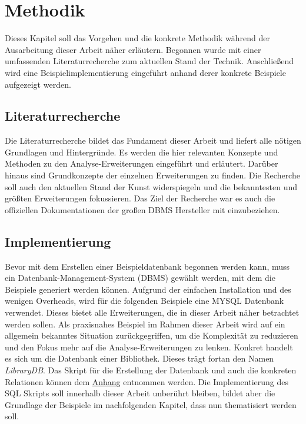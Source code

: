 \chapter{Methodik}
\label{chap:methodik} Dieses Kapitel soll das Vorgehen und die konkrete Methodik
während der Ausarbeitung dieser Arbeit näher erläutern. Begonnen wurde mit einer
umfassenden Literaturrecherche zum aktuellen Stand der Technik. Anschließend wird
eine Beispielimplementierung eingeführt anhand derer konkrete Beispiele aufgezeigt
werden.

\section{Literaturrecherche}
\label{sec:literaturrecherche} Die Literaturrecherche bildet das Fundament dieser
Arbeit und liefert alle nötigen Grundlagen und Hintergründe. Es werden die hier
relevanten Konzepte und Methoden zu den Analyse-Erweiterungen eingeführt und
erläutert. Darüber hinaus sind Grundkonzepte der einzelnen Erweiterungen zu finden.
Die Recherche soll auch den aktuellen Stand der Kunst widerspiegeln und die
bekanntesten und größten Erweiterungen fokussieren. Das Ziel der Recherche war es
auch die offiziellen Dokumentationen der großen DBMS Hersteller mit einzubeziehen.

\section{Implementierung}
\label{sec:implementierung} Bevor mit dem Erstellen einer Beispieldatenbank begonnen
werden kann, muss ein Datenbank-Management-System (DBMS) gewählt werden, mit dem
die Beispiele generiert werden können. Aufgrund der einfachen Installation und
des wenigen Overheads, wird für die folgenden Beispiele eine MYSQL Datenbank verwendet.
Dieses bietet alle Erweiterungen, die in dieser Arbeit näher betrachtet werden sollen.
Als praxisnahes Beispiel im Rahmen dieser Arbeit wird auf ein allgemein
bekanntes Situation zurückgegriffen, um die Komplexität zu reduzieren und den Fokus
mehr auf die Analyse-Erweiterungen zu lenken. Konkret handelt es sich um die
Datenbank einer Bibliothek. Dieses trägt fortan den Namen \textit{LibraryDB}. Das
Skript für die Erstellung der Datenbank und auch die konkreten Relationen können
dem \hyperref[sec:library_db]{Anhang} entnommen werden. Die Implementierung des
SQL Skripts soll innerhalb dieser Arbeit unberührt bleiben, bildet aber die Grundlage
der Beispiele im nachfolgenden Kapitel, dass nun thematisiert werden soll.
